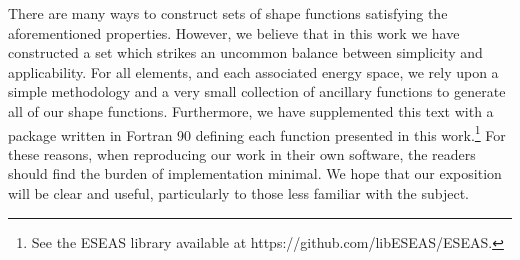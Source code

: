 There are many ways to construct sets of shape functions satisfying the aforementioned properties.
However, we believe that in this work we have constructed a set which strikes an uncommon balance between simplicity and applicability. %
For all elements, and each associated energy space, we rely upon a simple methodology and a very small collection of ancillary functions to generate all of our shape functions.
Furthermore, we have supplemented this text with a package written in Fortran 90 defining each function presented in this work.\footnote{See the ESEAS library available at https://github.com/libESEAS/ESEAS.}
For these reasons, when reproducing our work in their own software, the readers should find the burden of implementation minimal.
We hope that our exposition will be clear and useful, particularly to those less familiar with the subject.



